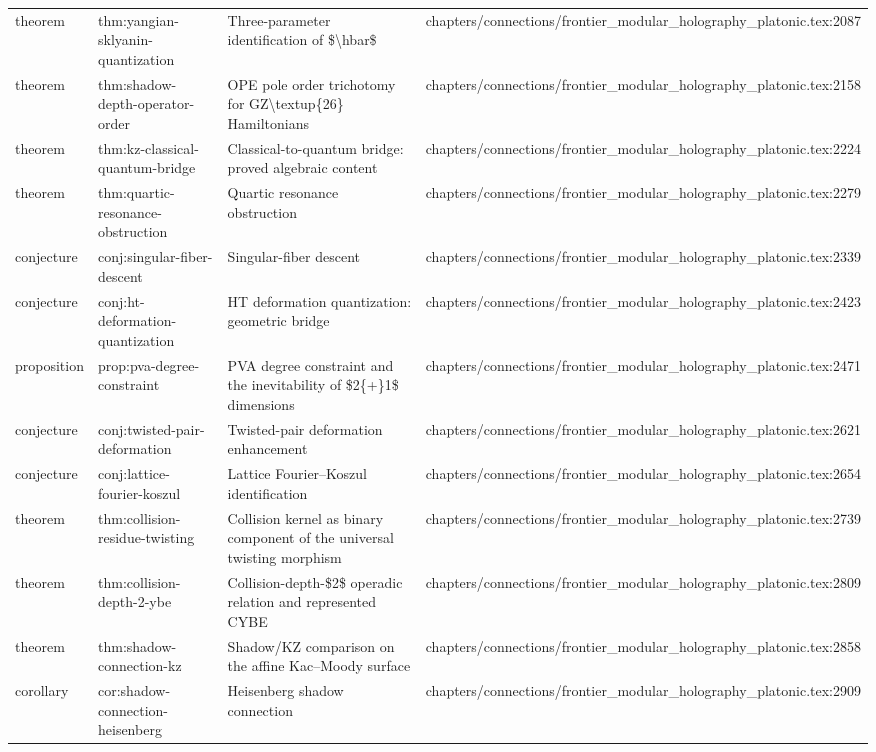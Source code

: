 \documentclass[11pt]{article}
\begin{document}
\begin{longtable}{L{0.10\textwidth}L{0.26\textwidth}L{0.42\textwidth}L{0.22\textwidth}}
theorem & thm:yangian-sklyanin-quantization & Three-parameter identification of \$\textbackslash{}hbar\$ & chapters/connections/frontier\_modular\_holography\_platonic.tex:2087\\
theorem & thm:shadow-depth-operator-order & OPE pole order trichotomy for GZ\textbackslash{}textup\{26\} Hamiltonians & chapters/connections/frontier\_modular\_holography\_platonic.tex:2158\\
theorem & thm:kz-classical-quantum-bridge & Classical-to-quantum bridge: proved algebraic content & chapters/connections/frontier\_modular\_holography\_platonic.tex:2224\\
theorem & thm:quartic-resonance-obstruction & Quartic resonance obstruction & chapters/connections/frontier\_modular\_holography\_platonic.tex:2279\\
conjecture & conj:singular-fiber-descent & Singular-fiber descent & chapters/connections/frontier\_modular\_holography\_platonic.tex:2339\\
conjecture & conj:ht-deformation-quantization & HT deformation quantization: geometric bridge & chapters/connections/frontier\_modular\_holography\_platonic.tex:2423\\
proposition & prop:pva-degree-constraint & PVA degree constraint and the inevitability of \$2\{+\}1\$ dimensions & chapters/connections/frontier\_modular\_holography\_platonic.tex:2471\\
conjecture & conj:twisted-pair-deformation & Twisted-pair deformation enhancement & chapters/connections/frontier\_modular\_holography\_platonic.tex:2621\\
conjecture & conj:lattice-fourier-koszul & Lattice Fourier--Koszul identification & chapters/connections/frontier\_modular\_holography\_platonic.tex:2654\\
theorem & thm:collision-residue-twisting & Collision kernel as binary component of the universal twisting morphism & chapters/connections/frontier\_modular\_holography\_platonic.tex:2739\\
theorem & thm:collision-depth-2-ybe & Collision-depth-\$2\$ operadic relation and represented CYBE & chapters/connections/frontier\_modular\_holography\_platonic.tex:2809\\
theorem & thm:shadow-connection-kz & Shadow/KZ comparison on the affine Kac--Moody surface & chapters/connections/frontier\_modular\_holography\_platonic.tex:2858\\
corollary & cor:shadow-connection-heisenberg & Heisenberg shadow connection & chapters/connections/frontier\_modular\_holography\_platonic.tex:2909\\

\end{longtable}
\end{document}
